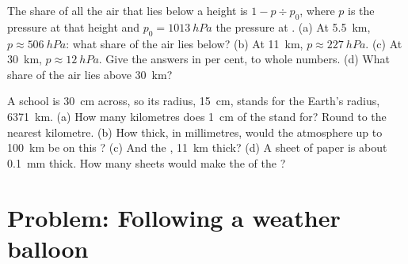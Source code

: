 \begin{exercise}[$\star\star\star$]\label{exo:g8:the-atmosphere:11}
The share of all the air that lies below a height is $1 - p \div
p_0$, where $p$ is the pressure at that height and $p_0 =
\qty{1013}{hPa}$ the pressure at . (a) At \qty{5.5}{km}, $p
\approx \qty{506}{hPa}$: what share of the air lies below? (b) At
\qty{11}{km}, $p \approx \qty{227}{hPa}$. (c) At \qty{30}{km}, $p \approx
\qty{12}{hPa}$. Give the answers in per cent, to whole numbers. (d) What share of the air lies above \qty{30}{km}?
\end{exercise}

\begin{exercise}[$\star\star\star$]\label{exo:g8:the-atmosphere:12}
A school  is \qty{30}{cm} across, so its radius, \qty{15}{cm},
stands for the Earth's radius, \qty{6371}{km}. (a) How many kilometres
does \qty{1}{cm} of the  stand for? Round to the nearest kilometre.
(b) How thick, in millimetres, would the atmosphere up to \qty{100}{km}
be on this ? (c) And the , \qty{11}{km} thick? (d) A
sheet of paper is about \qty{0.1}{mm} thick. How many sheets would make
the  of the ?
\end{exercise}

\section{Problem: Following a weather balloon}

